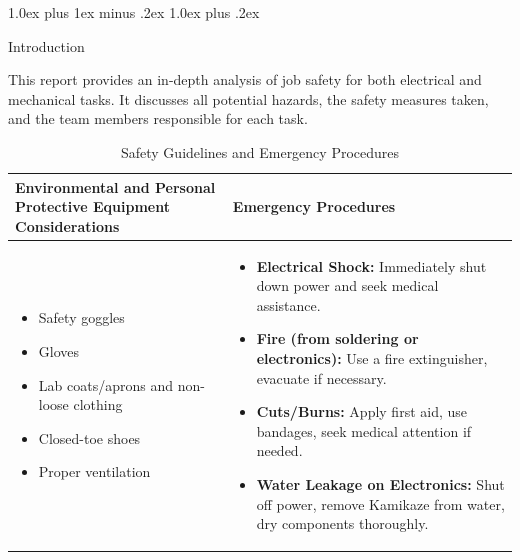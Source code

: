 \documentclass[conference, 12pt]{IEEEtran}
\makeatletter
\def\section{\@startsection {section}{1}{\z@}%
    {1.0ex plus 1ex minus .2ex}%
    {1.0ex plus .2ex}%
    {\normalfont\normalsize\bfseries\raggedright}}
\makeatother
\begin{document}
\onecolumn

\section{Introduction}

This report provides an in-depth analysis of job safety for both electrical and
mechanical tasks. It discusses all potential hazards, the safety measures
taken, and the team members responsible for each task.

\begin{table}[h]
    \centering
    \setlength{\arrayrulewidth}{1pt} %
    \setlength{\tabcolsep}{10pt} %
    \begin{tabular}{|p{9cm}|p{7cm}|}
        \hline
        \rowcolor{gray!20} \textbf{Environmental and Personal Protective Equipment Considerations} & \textbf{Emergency Procedures} \\
        \hline
        \vspace{-0.8\baselineskip}\begin{itemize}[leftmargin=*]
            \item Safety goggles
            \item Gloves
            \item Lab coats/aprons and non-loose clothing
            \item Closed-toe shoes
            \item Proper ventilation
        \end{itemize}
        &
        \vspace{-0.8\baselineskip}\begin{itemize}[leftmargin=*]
            \item \textbf{Electrical Shock:} Immediately shut down power and seek medical assistance.
            \item \textbf{Fire (from soldering or electronics):} Use a fire extinguisher, evacuate if necessary.
            \item \textbf{Cuts/Burns:} Apply first aid, use bandages, seek medical attention if needed.
            \item \textbf{Water Leakage on Electronics:} Shut off power, remove Kamikaze from water, dry components thoroughly.
        \end{itemize} \\
        \hline
    \end{tabular}
    \caption{Safety Guidelines and Emergency Procedures}
\end{table}
\end{document}
